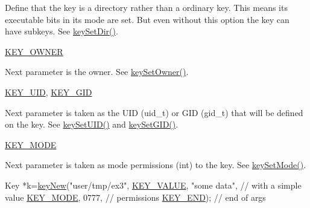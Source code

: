 \begin{DoxyRefList}
\begin{DoxyItemize}
 Define that the key is a directory rather than a ordinary key. This means its executable bits in its mode are set. But even without this option the key can have subkeys. See \hyperlink{group__keymeta_gaae575bd86a628a15ee45baa860522e75}{key\-Set\-Dir()}.
\item \hyperlink{group__key_gga91fb3178848bd682000958089abbaf40a77ca60362fa8daca8d5347db4385068b}{K\-E\-Y\-\_\-\-O\-W\-N\-E\-R} \par
 Next parameter is the owner. See \hyperlink{group__keyname_ga88d6ec200ba0707b7c1b4a88133d2be4}{key\-Set\-Owner()}.
\item \hyperlink{group__key_gga91fb3178848bd682000958089abbaf40a28f01a87d65f065172f734c9c9446c0e}{K\-E\-Y\-\_\-\-U\-I\-D}, \hyperlink{group__key_gga91fb3178848bd682000958089abbaf40ac0628bbaba7c837ca73323681393d15f}{K\-E\-Y\-\_\-\-G\-I\-D} \par
 Next parameter is taken as the U\-I\-D (uid\-\_\-t) or G\-I\-D (gid\-\_\-t) that will be defined on the key. See \hyperlink{group__keymeta_gab5f284f5ecd261e0a290095f50ba1af7}{key\-Set\-U\-I\-D()} and \hyperlink{group__keymeta_ga9e3d0fb3f7ba906e067727b9155d22e3}{key\-Set\-G\-I\-D()}.
\item \hyperlink{group__key_gga91fb3178848bd682000958089abbaf40a1b0a91ff3a855d6993930ebf0abaa518}{K\-E\-Y\-\_\-\-M\-O\-D\-E} \par
 Next parameter is taken as mode permissions (int) to the key. See \hyperlink{group__keymeta_ga8803037e35b9da1ce492323a88ff6bc3}{key\-Set\-Mode()}. 
\begin{DoxyCodeInclude}
Key *k=\hyperlink{group__key_gad23c65b44bf48d773759e1f9a4d43b89}{keyNew}(\textcolor{stringliteral}{"user/tmp/ex3"},
        \hyperlink{group__key_gga91fb3178848bd682000958089abbaf40ac66e4a49d09212b79f5754ca6db5bd2e}{KEY\_VALUE}, \textcolor{stringliteral}{"some data"},    \textcolor{comment}{// with a simple value}
        \hyperlink{group__key_gga91fb3178848bd682000958089abbaf40a1b0a91ff3a855d6993930ebf0abaa518}{KEY\_MODE}, 0777,            \textcolor{comment}{// permissions}
        \hyperlink{group__key_gga91fb3178848bd682000958089abbaf40aa8adb6fcb92dec58fb19410eacfdd403}{KEY\_END});                  \textcolor{comment}{// end of args}
\end{DoxyCodeInclude}


\end{DoxyItemize}
\end{DoxyRefList}
